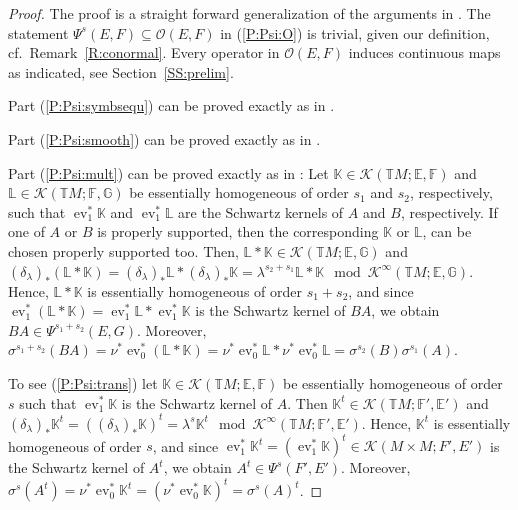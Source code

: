 \documentclass[reqno,12pt]{amsart}
\DeclareMathOperator{\ev}{ev}
\newcommand\K{\mathbb K}
\newcommand\itemref[1]{(\ref{#1})}
\theoremstyle{plain}
\theoremstyle{definition}
\begin{document}
\begin{proof}
The proof is a straight forward generalization of the arguments in \cite{EY15}.
The statement $\Psi^s(E,F)\subseteq\mathcal O(E,F)$ in \itemref{P:Psi:O} is trivial, given our definition, cf.\ Remark~\ref{R:conormal}.
Every operator in $\mathcal O(E,F)$ induces continuous maps as indicated, see Section~\ref{SS:prelim}.


Part \itemref{P:Psi:symbsequ} can be proved exactly as in \cite[Lemma~50 and Corollary~53]{EY15}.


Part \itemref{P:Psi:smooth} can be proved exactly as in \cite[Corollary~73]{EY15}.


Part \itemref{P:Psi:mult} can be proved exactly as in \cite[Proposition~49]{EY15}:
Let $\K\in\mathcal K(\mathbb TM;\mathbb E,\mathbb F)$ and $\mathbb L\in\mathcal K(\mathbb TM;\mathbb F,\mathbb G)$ be essentially homogeneous of order $s_1$ and $s_2$, respectively, such that $\ev_1^*\mathbb K$ and $\ev_1^*\mathbb L$ are the Schwartz kernels of $A$ and $B$, respectively. 
If one of $A$ or $B$ is properly supported, then the corresponding $\mathbb K$ or $\mathbb L$, can be chosen properly supported too.
Then, $\mathbb L*\mathbb K\in\mathcal K(\mathbb TM;\mathbb E,\mathbb G)$ and $(\delta_\lambda)_*(\mathbb L*\mathbb K)=(\delta_\lambda)_*\mathbb L*(\delta_\lambda)_*\mathbb K=\lambda^{s_2+s_1}\mathbb L*\mathbb K\mod\mathcal K^\infty(\mathbb TM;\mathbb E,\mathbb G)$.
Hence, $\mathbb L*\mathbb K$ is essentially homogeneous of order $s_1+s_2$, and since $\ev_1^*(\mathbb L*\mathbb K)=\ev_1^*\mathbb L*\ev_1^*\mathbb K$ is the Schwartz kernel of $BA$, we obtain $BA\in\Psi^{s_1+s_2}(E,G)$.
Moreover, $\sigma^{s_1+s_2}(BA)=\nu^*\ev_0^*(\mathbb L*\mathbb K)=\nu^*\ev_0^*\mathbb L*\nu^*\ev_0^*\mathbb L=\sigma^{s_2}(B)\sigma^{s_1}(A)$.


To see \itemref{P:Psi:trans} let $\K\in\mathcal K(\mathbb TM;\mathbb E,\mathbb F)$ be essentially homogeneous of order $s$ such that $\ev_1^*\mathbb K$ is the Schwartz kernel of $A$. 
Then $\mathbb K^t\in\mathcal K(\mathbb TM;\mathbb F',\mathbb E')$ and $(\delta_\lambda)_*\mathbb K^t=((\delta_\lambda)_*\mathbb K)^t=\lambda^s\mathbb K^t\mod\mathcal K^\infty(\mathbb TM;\mathbb F',\mathbb E')$.
Hence, $\mathbb K^t$ is essentially homogeneous of order $s$, and since $\ev_1^*\mathbb K^t=(\ev_1^*\mathbb K)^t\in\mathcal K(M\times M;F',E')$ is the Schwartz kernel of $A^t$, we obtain $A^t\in\Psi^s(F',E')$.
Moreover, $\sigma^s(A^t)=\nu^*\ev_0^*\mathbb K^t=(\nu^*\ev_0^*\mathbb K)^t=\sigma^s(A)^t$.



\end{proof}
\end{document}
